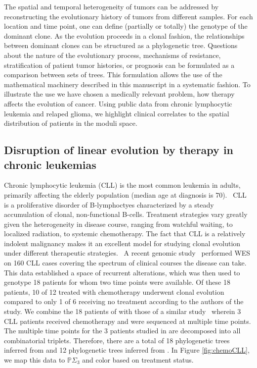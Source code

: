 \documentclass[a4paper,11pt]{article}
\begin{document}
The spatial and temporal heterogeneity of tumors can be addressed by reconstructing the evolutionary history of tumors from different samples.
For each location and time point, one can define (partially or totally) the genotype of the dominant clone.
As the evolution proceeds in a clonal fashion, the relationships between dominant clones can be structured as a phylogenetic tree.
Questions about the nature of the evolutionary process, mechanisms of resistance, stratification of patient tumor histories, or prognosis can be formulated as a comparison between sets of trees.
This formulation allows the use of the mathematical machinery described in this manuscript in a systematic fashion.
To illustrate the use we have chosen a medically relevant problem, how therapy affects the evolution of cancer.
Using public data from chronic lymphocytic leukemia and relaped glioma, we highlight clinical correlates to the spatial distribution of patients in the moduli space.

\subsection{Disruption of linear evolution by therapy in chronic leukemias}

Chronic lymphocytic leukemia (CLL) is the most common leukemia in adults, primarily affecting the elderly population (median age at diagnosis is 70).~\cite{smith2011incidence}
CLL is a proliferative disorder of B-lymphoctyes characterized by a steady accumulation of clonal, non-functional B-cells.
Treatment strategies vary greatly given the heterogeneity in disease course, ranging from watchful waiting, to localized radiation, to systemic chemotherapy.
The fact that CLL is a relatively indolent malignancy makes it an excellent model for studying clonal evolution under different therapeutic strategies.~\cite{wang2015tumor}  
A recent genomic study~\cite{landau2013evolution} performed WES on 160 CLL cases covering the spectrum of clinical courses the disease can take.
This data established a space of recurrent alterations, which was then used to genotype 18 patients for whom two time points were available.
Of these 18 patients, 10 of 12 treated with chemotherapy underwent clonal evolution compared to only 1 of 6 receiving no treatment according to the authors of the study.
We combine the 18 patients of \cite{landau2013evolution} with those of a similar study~\cite{schuh2012monitoring} wherein 3 CLL patients received chemotherapy and were sequenced at multiple time points.
The multiple time points for the 3 patients studied in \cite{schuh2012monitoring} are decomposed into all combinatorial triplets.
Therefore, there are a total of 18 phylogenetic trees inferred from \cite{landau2013evolution} and 12 phylogenetic trees inferred from \cite{schuh2012monitoring}.
In Figure \ref{fig:chemoCLL}, we map this data to $\mathbb{P}\Sigma_3$ and color based on treatment status.
\end{document}
